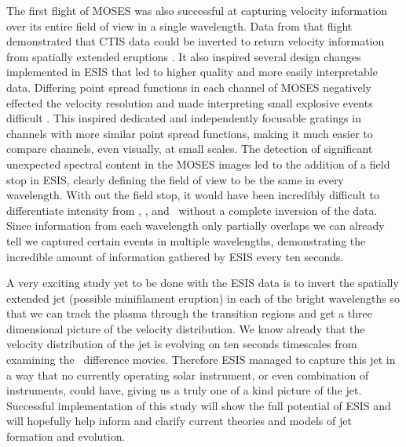 The first flight of MOSES was also successful at capturing velocity information over its entire field of view in a single wavelength.
Data from that flight demonstrated that CTIS data could be inverted to return velocity information from spatially extended eruptions \citep{Fox2010}.
It also inspired several design changes implemented in ESIS \citep{ESIS} that led to higher quality and more easily interpretable data.
Differing point spread functions in each channel of MOSES negatively effected the velocity resolution and made interpreting small explosive events difficult \citep{Fox2010,Rust2019}.
This inspired dedicated and independently focusable gratings in channels with more similar point spread functions, making it much easier to compare channels, even visually, at small scales.
The detection of significant unexpected spectral content in the MOSES images led to the addition of a field stop in ESIS, clearly defining the field of view to be the same in every wavelength.
With out the field stop, it would have been incredibly difficult to differentiate intensity from \ov, \mgxbright, and \hei\ without a complete inversion of the data.
Since information from each wavelength only partially overlaps we can already tell we captured certain events in multiple wavelengths, demonstrating the incredible amount of information gathered by ESIS every ten seconds. 

A very exciting study yet to be done with the ESIS data is to invert the spatially extended jet (possible minifilament eruption) in each of the bright wavelengths so that we can track the plasma through the transition regions and get a three dimensional picture of the velocity distribution.
We know already that the velocity distribution of the jet is evolving on ten seconds timescales from examining the \ov\ difference movies.
Therefore ESIS managed to capture this jet in a way that no currently operating solar instrument, or even combination of instruments, could have, giving us a truly one of a kind picture of the jet.
Successful implementation of this study will show the full potential of ESIS and will hopefully help inform and clarify current theories and models of jet formation and evolution.

